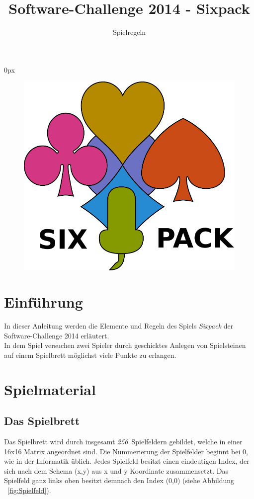 \documentclass[a4paper, ngerman]{scrartcl}
\title{Software-Challenge 2014 - Sixpack}
\subtitle{Spielregeln}
\newcommand{\SpielFelderAnzahl}{\emph{256}}
\begin{document}
\parindent0px
\maketitle

\begin{figure}[h]
	\centering
	\includegraphics[scale = 1.0]{images/sixpack_logo.pdf}
\end{figure}
\vspace*{\fill}

\newpage
\tableofcontents
\newpage

\section{Einführung}
In dieser Anleitung werden die Elemente und Regeln des Spiels \emph{Sixpack}
der Software-Challenge 2014 erläutert.\\
In dem Spiel versuchen zwei Spieler durch geschicktes Anlegen von Spielsteinen auf einem Spielbrett möglichst viele Punkte zu erlangen.

\section{Spielmaterial}
\subsection{Das Spielbrett}
Das Spielbrett wird durch insgesamt \SpielFelderAnzahl\ Spielfeldern gebildet, welche in einer 16x16 Matrix angeordnet sind. Die Nummerierung der Spielfelder beginnt bei 0, wie in der Informatik üblich. Jedes Spielfeld besitzt einen eindeutigen Index, der sich  nach dem Schema (x,y) aus x und y Koordinate zusammensetzt. Das Spielfeld ganz links oben besitzt demnach den Index (0,0) (siehe Abbildung ~\ref{fig:Spielfeld}).\\
\end{document}
